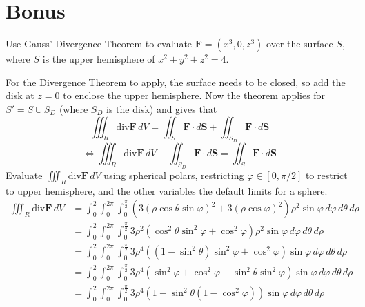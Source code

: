 \documentclass{article}
\newcommand{\divt}{\text{div}}
\begin{document}
\section*{Bonus}
Use Gauss' Divergence Theorem to evaluate $\boldsymbol F = (x^3, 0, z^3)$ over the surface $S$, where $S$ is the upper hemisphere of $x^2 + y^2 + z^2 = 4$.
    
    For the Divergence Theorem to apply, the surface needs to be closed, so add the disk at $z = 0$ to enclose the upper hemisphere. Now the theorem applies for $S' = S \cup S_{D}$ (where $S_D$ is the disk) and gives that
    \[ \iiint_R \divt \boldsymbol F \, dV = \iint_S \boldsymbol F \cdot d \boldsymbol S + \iint_{S_D} \boldsymbol F \cdot d \boldsymbol S \]
    \[ \iff \iiint_R \divt \boldsymbol F \, dV - \iint_{S_D} \boldsymbol F \cdot d \boldsymbol S = \iint_S \boldsymbol F \cdot d \boldsymbol S \]
    Evaluate $\displaystyle \iiint_R \divt \boldsymbol F \, dV$ using spherical polars, restricting $\varphi \in [0, \pi/2]$ to restrict to upper hemisphere, and the other variables the default limits for a sphere.
    \begin{align*} 
        \iiint_R \divt \boldsymbol F \, dV &= \int_0^{2} \int_0^{2\pi} \int_0^{\frac{\pi}{2}} (3(\rho \cos \theta \sin \varphi)^2 + 3(\rho \cos \varphi)^2 ) \rho^2 \sin \varphi \, d\varphi \, d\theta \, d\rho \\
        &= \int_0^{2} \int_0^{2\pi} \int_0^{\frac{\pi}{2}} 3\rho^2 (\cos^2 \theta \sin^2 \varphi + \cos^2 \varphi)\rho^2 \sin \varphi \, d\varphi \, d\theta \, d\rho \\
        &= \int_0^{2} \int_0^{2\pi} \int_0^{\frac{\pi}{2}} 3\rho^4 ((1 - \sin^2 \theta) \sin^2 \varphi + \cos^2 \varphi) \sin \varphi \, d\varphi \, d\theta \, d\rho \\
        &= \int_0^{2} \int_0^{2\pi} \int_0^{\frac{\pi}{2}} 3\rho^4 (\sin^2 \varphi + \cos^2 \varphi  - \sin^2 \theta \sin^2 \varphi ) \sin \varphi \, d\varphi \, d\theta \, d\rho \\
        &= \int_0^{2} \int_0^{2\pi} \int_0^{\frac{\pi}{2}} 3\rho^4 (1 - \sin^2 \theta (1 - \cos^2 \varphi)) \sin \varphi \, d\varphi \, d\theta \, d\rho \\
    \end{align*} 
\end{document}
